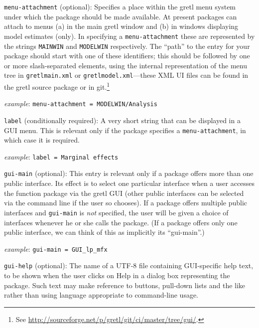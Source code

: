 \documentclass[oneside]{book}
\newcommand{\ttusage}[1]{\textit{example}: \quad \texttt{#1}}
\newcommand{\vbusage}[0]{\textit{example}: \quad}
\begin{document}
\begin{description}

\item \texttt{menu-attachment} (optional): Specifies a place within
  the gretl menu system under which the package should be made
  available. At present packages can attach to menus (a) in the main
  gretl window and (b) in windows displaying model estimates
  (only). In specifying a \texttt{menu-attachment} these are
  represented by the strings \texttt{MAINWIN} and \texttt{MODELWIN}
  respectively. The ``path'' to the entry for your package should
  start with one of these identifiers; this should be followed by one
  or more slash-separated elements, using the internal representation
  of the menu tree in \texttt{gretlmain.xml} or
  \texttt{gretlmodel.xml}---these XML UI files can be found in the
  gretl source package or in git.\footnote{See
    \url{http://sourceforge.net/p/gretl/git/ci/master/tree/gui/}.}

  \ttusage{menu-attachment = MODELWIN/Analysis}

\item \texttt{label} (conditionally required): A very short string
  that can be displayed in a GUI menu. This is relevant only if the
  package specifies a \texttt{menu-attachment}, in which case it is
  required.

  \ttusage{label = Marginal effects}

\item \texttt{gui-main} (optional): This entry is relevant only if a
  package offers more than one public interface. Its effect is to
  select one particular interface when a user accesses the function
  package via the gretl GUI (other public interfaces can be selected
  via the command line if the user so chooses). If a package offers
  multiple public interfaces and \texttt{gui-main} is \textit{not}
  specified, the user will be given a choice of interfaces whenever he
  or she calls the package. (If a package offers only one public
  interface, we can think of this as implicitly its ``gui-main''.)

  \vbusage{} \verb|gui-main = GUI_lp_mfx|

\item \texttt{gui-help} (optional): The name of a UTF-8 file
  containing GUI-specific help text, to be shown when the user
  clicks on \textsf{Help} in a dialog box representing the
  package. Such text may make reference to buttons, pull-down lists
  and the like rather than using language appropriate to command-line
  usage.


\end{description}
\end{document}
